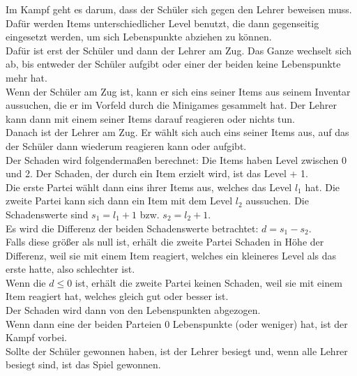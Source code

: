 Im Kampf geht es darum, dass der Schüler sich gegen den Lehrer beweisen muss. Dafür werden Items unterschiedlicher Level benutzt, die dann gegenseitig eingesetzt werden, um sich Lebenspunkte abziehen zu können.\\
Dafür ist erst der Schüler und dann der Lehrer am Zug. Das Ganze wechselt sich ab, bis entweder der Schüler aufgibt oder einer der beiden keine Lebenspunkte mehr hat.\\
Wenn der Schüler am Zug ist, kann er sich eins seiner Items aus seinem Inventar aussuchen, die er im Vorfeld durch die Minigames gesammelt hat. Der Lehrer kann dann mit einem seiner Items darauf reagieren oder nichts tun.\\
Danach ist der Lehrer am Zug. Er wählt sich auch eins seiner Items aus, auf das der Schüler dann wiederum reagieren kann oder aufgibt.\\
Der Schaden wird folgendermaßen berechnet: Die Items haben Level zwischen 0 und 2. Der Schaden, der durch ein Item erzielt wird, ist das Level + 1.\\
Die erste Partei wählt dann eins ihrer Items aus, welches das Level $l_1$ hat. Die zweite Partei kann sich dann ein Item mit dem Level $l_2$ aussuchen. Die Schadenswerte sind $s_1 = l_1 + 1$ bzw. $s_2 = l_2 + 1$.\\
Es wird die Differenz der beiden Schadenswerte betrachtet: $d = s_1 - s_2$.\\
Falls diese größer als null ist, erhält die zweite Partei Schaden in Höhe der Differenz, weil sie mit einem Item reagiert, welches ein kleineres Level als das erste hatte, also schlechter ist.\\
Wenn die $d\leq 0$ ist, erhält die zweite Partei keinen Schaden, weil sie mit einem Item reagiert hat, welches gleich gut oder besser ist.\\
Der Schaden wird dann von den Lebenspunkten abgezogen.\\
Wenn dann eine der beiden Parteien 0 Lebenspunkte (oder weniger) hat, ist der Kampf vorbei.\\
Sollte der Schüler gewonnen haben, ist der Lehrer besiegt und, wenn alle Lehrer besiegt sind, ist das Spiel gewonnen.\\
